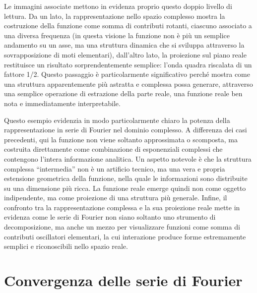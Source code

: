 \documentclass[a4paper,12pt]{report}
\begin{document}
Le immagini associate mettono in evidenza proprio questo doppio livello di lettura. Da un lato, la rappresentazione nello spazio complesso mostra la costruzione della funzione come somma di contributi rotanti, ciascuno associato a una diversa frequenza (in questa visione la funzione non è più un semplice andamento su un asse, ma una struttura dinamica che si sviluppa attraverso la sovrapposizione di moti elementari), dall’altro lato, la proiezione sul piano reale restituisce un risultato sorprendentemente semplice: l’onda quadra riscalata di un fattore 1/2. Questo passaggio è particolarmente significativo perché mostra come una struttura apparentemente più astratta e complessa possa generare, attraverso una semplice operazione di estrazione della parte reale, una funzione reale ben nota e immediatamente interpretabile.

Questo esempio evidenzia in modo particolarmente chiaro la potenza della rappresentazione in serie di Fourier nel dominio complesso. A differenza dei casi precedenti, qui la funzione non viene soltanto approssimata o scomposta, ma costruita direttamente come combinazione di esponenziali complessi che contengono l’intera informazione analitica.
Un aspetto notevole è che la struttura complessa “intermedia” non è un artificio tecnico, ma una vera e propria estensione geometrica della funzione, nella quale le informazioni sono distribuite su una dimensione più ricca. La funzione reale emerge quindi non come oggetto indipendente, ma come proiezione di una struttura più generale.
Infine, il confronto tra la rappresentazione complessa e la sua proiezione reale mette in evidenza come le serie di Fourier non siano soltanto uno strumento di decomposizione, ma anche un mezzo per visualizzare funzioni come somma di contributi oscillatori elementari, la cui interazione produce forme estremamente semplici e riconoscibili nello spazio reale.

\newpage

\section{Convergenza delle serie di Fourier}
\end{document}
